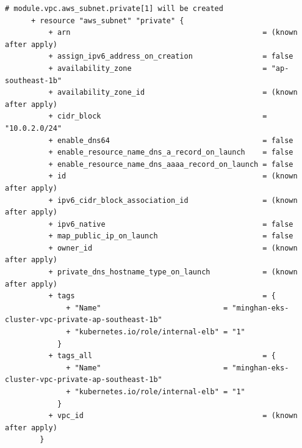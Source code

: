 \begin{lstlisting}[caption={terraform plan output for \texttt{cloudkube} provisioning}, breaklines=true, breakatwhitespace=false]
      # module.vpc.aws_subnet.private[1] will be created
      + resource "aws_subnet" "private" {
          + arn                                            = (known after apply)
          + assign_ipv6_address_on_creation                = false
          + availability_zone                              = "ap-southeast-1b"
          + availability_zone_id                           = (known after apply)
          + cidr_block                                     = "10.0.2.0/24"
          + enable_dns64                                   = false
          + enable_resource_name_dns_a_record_on_launch    = false
          + enable_resource_name_dns_aaaa_record_on_launch = false
          + id                                             = (known after apply)
          + ipv6_cidr_block_association_id                 = (known after apply)
          + ipv6_native                                    = false
          + map_public_ip_on_launch                        = false
          + owner_id                                       = (known after apply)
          + private_dns_hostname_type_on_launch            = (known after apply)
          + tags                                           = {
              + "Name"                            = "minghan-eks-cluster-vpc-private-ap-southeast-1b"
              + "kubernetes.io/role/internal-elb" = "1"
            }
          + tags_all                                       = {
              + "Name"                            = "minghan-eks-cluster-vpc-private-ap-southeast-1b"
              + "kubernetes.io/role/internal-elb" = "1"
            }
          + vpc_id                                         = (known after apply)
        }
    

\end{lstlisting}
